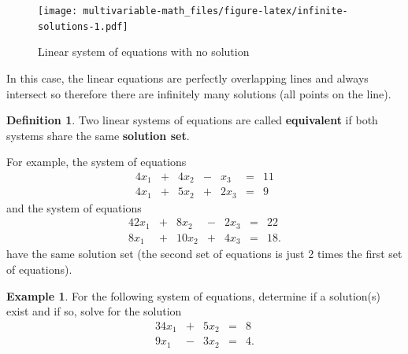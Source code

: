 \documentclass[
]{book}
\theoremstyle{definition}
\newtheorem{definition}{Definition}[chapter]
\theoremstyle{definition}
\newtheorem{example}{Example}[chapter]
\theoremstyle{definition}
\theoremstyle{definition}
\theoremstyle{remark}
\begin{document}
\begin{figure}
\centering
\texttt{[image: multivariable-math\_files/figure-latex/infinite-solutions-1.pdf]}
\caption{\label{fig:infinite-solutions}Linear system of equations with no solution}
\end{figure}

In this case, the linear equations are perfectly overlapping lines and always intersect so therefore there are infinitely many solutions (all points on the line).

\begin{definition}
Two linear systems of equations are called \textbf{equivalent} if both systems share the same \textbf{solution set}.
\end{definition}

For example, the system of equations
\begin{alignat*}{4}
x_1   & {}+{} & 4 x_2 & {}-{} & x_3 & {}={} & 11 \\
4 x_1 & {}+{} & 5 x_2 & {}+{} & 2 x_3 & {}={} & 9
\end{alignat*}
and the system of equations
\begin{alignat*}{4}
2x_1   & {}+{} & 8 x_2 & {}-{} & 2 x_3 & {}={} & 22 \\
8 x_1 & {}+{} & 10 x_2 & {}+{} & 4 x_3 & {}={} & 18.
\end{alignat*}
have the same solution set (the second set of equations is just 2 times the first set of equations).

\begin{example}
For the following system of equations, determine if a solution(s) exist and if so, solve for the solution
\begin{alignat*}{3}
4 x_1 & {}+{} & 5 x_2 & {}={} & 8 \\
9 x_1 & {}-{} & 3 x_2 & {}={} & 4.
\end{alignat*}
\end{example}
\end{document}
